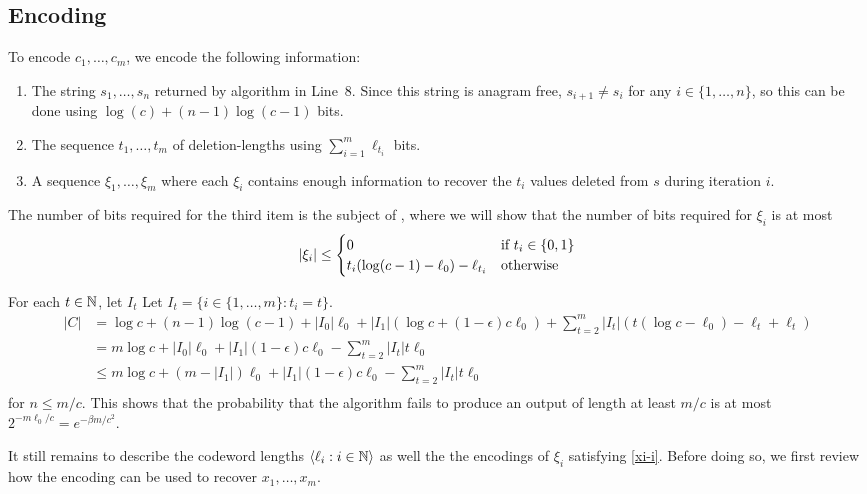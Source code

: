 \documentclass{patmorin}
\begin{document}
\subsection{Encoding}

To encode $c_1,\ldots,c_m$, we encode the following information:
\begin{enumerate}
  \item The string $s_1,\ldots,s_n$ returned by algorithm in Line~8. Since this string is anagram free, $s_{i+1}\neq s_{i}$ for any $i\in\{1,\ldots,n\}$, so this can be done using $\log(c) + (n-1)\log(c-1)$ bits.
  \item The sequence $t_1,\ldots,t_m$ of deletion-lengths using $\sum_{i=1}^m \ell_{t_i}$ bits.
  \item A sequence $\xi_1,\ldots,\xi_m$ where each $\xi_i$ contains enough information to recover the $t_i$ values deleted from $s$ during iteration $i$.
\end{enumerate}

The number of bits required for the third item is the subject of , where we will show that the number of bits required for $\xi_i$ is at most
\begin{equation}
   |\xi_i| 
   \le \begin{cases}
     0 & \text{if $t_i\in \{0,1\}$} \\
     t_i(\log(c-1) - \ell_0) - \ell_{t_i} 
        & \text{otherwise}
   \end{cases}  \eqlabel{xi-i}
\end{equation}

For each $t\in\mathbb{N}$, let $I_t$ 
Let $I_t=\{i\in\{1,\ldots,m\}: t_i=t\}$.
\begin{align*}
    |C| 
    & = \log c + (n-1)\log(c-1) + |I_0|\ell_0 + |I_1|(\log c + (1-\epsilon)c\ell_0) + \sum_{t=2}^m|I_{t}| (t(\log c - \ell_0) - \ell_t + \ell_{t}) \\
    & = m\log c + |I_0|\ell_0 + |I_1|(1-\epsilon)c\ell_0 - \sum_{t=2}^m|I_{t}| t\ell_0 \\
    & \le m\log c + (m-|I_1|)\ell_0 + |I_1|(1-\epsilon)c\ell_0 - \sum_{t=2}^m|I_{t}| t\ell_0 \\
\end{align*}
for $n \le m/c$.  This shows that the probability that the algorithm fails to produce an output of length at least $m/c$ is at most $2^{-m\ell_0/c} = e^{-\beta m/c^2}$.

It still remains to describe the codeword lengths $\langle \ell_i:i\in \mathbb{N}\rangle$ as well the the encodings of $\xi_i$ satisfying \eqref{xi-i}.  Before doing so, we first review how the encoding can be used to recover $x_1,\ldots,x_m$.
\end{document}
